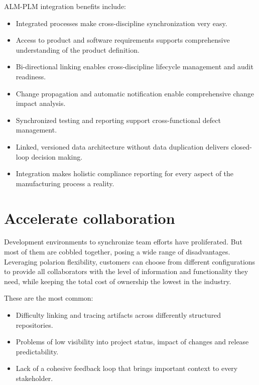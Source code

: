 \documentclass[thesis=M,english]{FITthesis}[2012/06/26]
\begin{document}
ALM-PLM integration benefits include:

\begin{itemize}[nosep]
	\item Integrated processes make cross-discipline synchronization
	very easy.
	\item Access to product and software requirements supports
	comprehensive understanding of the product definition.
	\item Bi-directional linking enables cross-discipline lifecycle
	management and audit readiness.
	\item Change propagation and automatic notification enable
	comprehensive change impact analysis.
	\item Synchronized testing and reporting support cross-functional
	defect management.
	\item Linked, versioned data architecture without data duplication
	delivers closed-loop decision making.
	\item Integration makes holistic compliance reporting for every
	aspect of the manufacturing process a reality.
\end{itemize}

\section{Accelerate collaboration}

Development environments to synchronize team efforts have proliferated. But most of them are cobbled together, posing a wide range of disadvantages. Leveraging \acrshort{polarion} flexibility, customers can choose from different configurations to provide all collaborators with the level of information and functionality they need, while keeping the total cost of ownership the lowest in the industry.

These are the most common:
\begin{itemize}[nosep]
	\item Difficulty linking and tracing artifacts across differently
	structured repositories.
	\item Problems of low visibility into project status, impact of
	changes and release predictability.
	\item Lack of a cohesive feedback loop that brings important
	context to every stakeholder.
\end{itemize}
\end{document}
